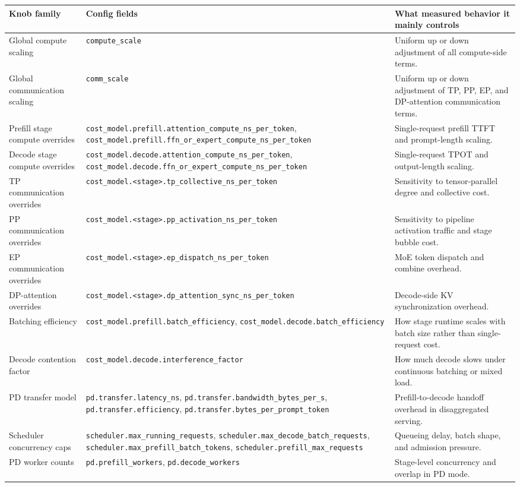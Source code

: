 \begin{longtable}{p{} p{} p{}}
\toprule
Knob family & Config fields & What measured behavior it mainly controls \\
\midrule
\endhead
Global compute scaling &
\texttt{compute\_scale} &
Uniform up or down adjustment of all compute-side terms. \\
Global communication scaling &
\texttt{comm\_scale} &
Uniform up or down adjustment of TP, PP, EP, and DP-attention communication terms. \\
Prefill stage compute overrides &
\texttt{cost\_model.prefill.attention\_compute\_ns\_per\_token},
\texttt{cost\_model.prefill.ffn\_or\_expert\_compute\_ns\_per\_token} &
Single-request prefill TTFT and prompt-length scaling. \\
Decode stage compute overrides &
\texttt{cost\_model.decode.attention\_compute\_ns\_per\_token},
\texttt{cost\_model.decode.ffn\_or\_expert\_compute\_ns\_per\_token} &
Single-request TPOT and output-length scaling. \\
TP communication overrides &
\texttt{cost\_model.<stage>.tp\_collective\_ns\_per\_token} &
Sensitivity to tensor-parallel degree and collective cost. \\
PP communication overrides &
\texttt{cost\_model.<stage>.pp\_activation\_ns\_per\_token} &
Sensitivity to pipeline activation traffic and stage bubble cost. \\
EP communication overrides &
\texttt{cost\_model.<stage>.ep\_dispatch\_ns\_per\_token} &
MoE token dispatch and combine overhead. \\
DP-attention overrides &
\texttt{cost\_model.<stage>.dp\_attention\_sync\_ns\_per\_token} &
Decode-side KV synchronization overhead. \\
Batching efficiency &
\texttt{cost\_model.prefill.batch\_efficiency},
\texttt{cost\_model.decode.batch\_efficiency} &
How stage runtime scales with batch size rather than single-request cost. \\
Decode contention factor &
\texttt{cost\_model.decode.interference\_factor} &
How much decode slows under continuous batching or mixed load. \\
PD transfer model &
\texttt{pd.transfer.latency\_ns},
\texttt{pd.transfer.bandwidth\_bytes\_per\_s},
\texttt{pd.transfer.efficiency},
\texttt{pd.transfer.bytes\_per\_prompt\_token} &
Prefill-to-decode handoff overhead in disaggregated serving. \\
Scheduler concurrency caps &
\texttt{scheduler.max\_running\_requests},
\texttt{scheduler.max\_decode\_batch\_requests},
\texttt{scheduler.max\_prefill\_batch\_tokens},
\texttt{scheduler.prefill\_max\_requests} &
Queueing delay, batch shape, and admission pressure. \\
PD worker counts &
\texttt{pd.prefill\_workers},
\texttt{pd.decode\_workers} &
Stage-level concurrency and overlap in PD mode. \\
\bottomrule
\end{longtable}

